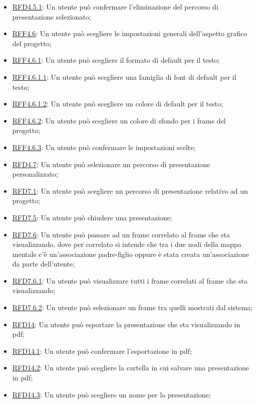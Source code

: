 \begin{itemize}
\item \hyperlink{RFD4.5.1}{RFD4.5.1}: Un utente può confermare l'eliminazione del percorso di presentazione selezionato;
\item \hyperlink{RFF4.6}{RFF4.6}: Un utente può scegliere le impostazioni generali dell’aspetto grafico del progetto;
\item \hyperlink{RFF4.6.1}{RFF4.6.1}: Un utente può scegliere il formato di default per il testo;
\item \hyperlink{RFF4.6.1.1}{RFF4.6.1.1}: Un utente può scegliere una famiglia di font di default per il testo;
\item \hyperlink{RFF4.6.1.2}{RFF4.6.1.2}: Un utente può scegliere un colore di default per il testo;
\item \hyperlink{RFF4.6.2}{RFF4.6.2}: Un utente può scegliere un colore di sfondo per i frame del progetto;
\item \hyperlink{RFF4.6.3}{RFF4.6.3}: Un utente può confermare le impostazioni scelte;
\item \hyperlink{RFD4.7}{RFD4.7}: Un utente può selezionare un percorso di presentazione personalizzato;
\item \hyperlink{RFD7.1}{RFD7.1}: Un utente può scegliere un percorso di presentazione relativo ad un progetto;
\item \hyperlink{RFD7.5}{RFD7.5}: Un utente può chiudere una presentazione;
\item \hyperlink{RFD7.6}{RFD7.6}: Un utente può passare ad un frame correlato al frame che sta visualizzando, dove per correlato si intende che tra i due nodi della mappa mentale c’è un’associazione padre-figlio oppure è stata creata un’associazione da parte dell’utente;
\item \hyperlink{RFD7.6.1}{RFD7.6.1}: Un utente può visualizzare tutti i frame correlati al frame che sta visualizzando;
\item \hyperlink{RFD7.6.2}{RFD7.6.2}: Un utente può selezionare un frame tra quelli mostrati dal sistema;
\item \hyperlink{RFD14}{RFD14}: Un utente può esportare la presentazione che sta visualizzando in pdf;
\item \hyperlink{RFD14.1}{RFD14.1}: Un utente può confermare l'esportazione in pdf;
\item \hyperlink{RFD14.2}{RFD14.2}: Un utente può scegliere la cartella in cui salvare una presentazione in pdf;
\item \hyperlink{RFD14.3}{RFD14.3}: Un utente può scegliere un nome per la presentazione;

\end{itemize}
